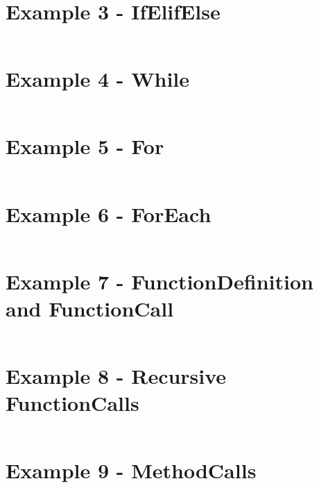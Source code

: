 \documentclass[]{full}
\theoremstyle{definition}
\begin{document}
\section{Example 3 - IfElifElse}
\label{appendix:sttp-examples-3}
\inputminted[autogobble, breaklines, tabsize=4]{text}{../../src/_examples/example_03/example_03.sttp}

\section{Example 4 - While}
\label{appendix:sttp-examples-4}
\inputminted[autogobble, breaklines, tabsize=4]{text}{../../src/_examples/example_04/example_04.sttp}

\section{Example 5 - For}
\label{appendix:sttp-examples-5}
\inputminted[autogobble, breaklines, tabsize=4]{text}{../../src/_examples/example_05/example_05.sttp}

\section{Example 6 - ForEach}
\label{appendix:sttp-examples-6}
\inputminted[autogobble, breaklines, tabsize=4]{text}{../../src/_examples/example_06/example_06.sttp}

\section{Example 7 - FunctionDefinition and FunctionCall}
\label{appendix:sttp-examples-7}
\inputminted[autogobble, breaklines, tabsize=4]{text}{../../src/_examples/example_07/example_07.sttp}

\section{Example 8 - Recursive FunctionCalls}
\label{appendix:sttp-examples-8}
\inputminted[autogobble, breaklines, tabsize=4]{text}{../../src/_examples/example_08/example_08.sttp}

\section{Example 9 - MethodCalls}
\label{appendix:sttp-examples-9}
\inputminted[autogobble, breaklines, tabsize=4]{text}{../../src/_examples/example_09/example_09.sttp}
\end{document}
